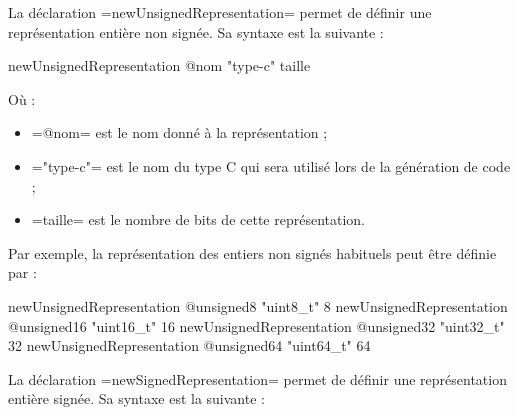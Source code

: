 



















La déclaration \plm=newUnsignedRepresentation= permet de définir une représentation entière non signée. Sa syntaxe est la suivante :


\begin{PLM}
newUnsignedRepresentation @nom "type-c" taille
\end{PLM}

Où :
\begin{itemize}
  \item \plm=@nom= est le nom donné à la représentation ;
  \item \plm="type-c"= est le nom du type C qui sera utilisé lors de la génération de code ;
  \item \plm=taille= est le nombre de bits de cette représentation.
\end{itemize}

Par exemple, la représentation des entiers non signés habituels peut être définie par :
\begin{PLM}
newUnsignedRepresentation @unsigned8  "uint8_t"   8
newUnsignedRepresentation @unsigned16 "uint16_t" 16
newUnsignedRepresentation @unsigned32 "uint32_t" 32
newUnsignedRepresentation @unsigned64 "uint64_t" 64
\end{PLM}









La déclaration \plm=newSignedRepresentation= permet de définir une représentation entière signée. Sa syntaxe est la suivante :


